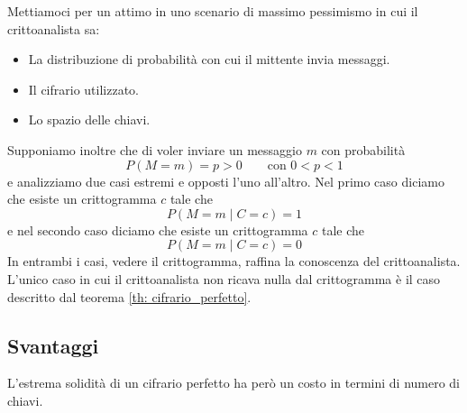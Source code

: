 \begin{example}
	Mettiamoci per un attimo in uno scenario di massimo pessimismo in cui il crittoanalista sa:
	\begin{itemize}
		\item La distribuzione di probabilit\`a con cui il mittente invia messaggi.
		\item Il cifrario utilizzato.
		\item Lo spazio delle chiavi.
	\end{itemize}
	Supponiamo inoltre che di voler inviare un messaggio $m$ con probabilit\`a
	\[ P(M = m) = p > 0 \quad \quad \text{con } 0 < p < 1 \]
	e analizziamo due casi estremi e opposti l'uno all'altro. Nel primo caso diciamo che esiste un crittogramma $c$ tale
	che
	\[ P(M = m \mid C = c) = 1 \]
	e nel secondo caso diciamo che esiste un crittogramma $c$ tale che
	\[ P(M = m \mid C = c) = 0 \]
	In entrambi i casi, vedere il crittogramma, raffina la conoscenza del crittoanalista. L'unico caso in cui il
	crittoanalista non ricava nulla dal crittogramma \`e il caso descritto dal teorema \ref{th: cifrario_perfetto}.
\end{example}

\subsection{Svantaggi}
L'estrema solidit\`a di un cifrario perfetto ha per\`o un costo in termini di numero di chiavi.

